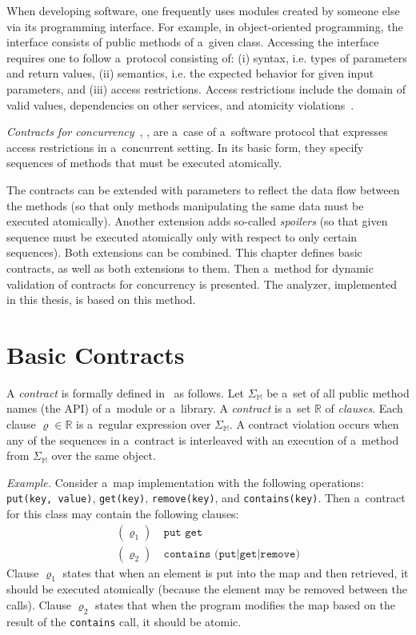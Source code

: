 When developing software, one frequently uses modules created by someone else
via its programming interface. For example, in object-oriented programming, the
interface consists of public methods of a~given class. Accessing the interface
requires one to follow a~protocol consisting of: (i) syntax, i.e. types of
parameters and return values, (ii) semantics, i.e. the expected behavior for
given input parameters, and (iii) access restrictions. Access restrictions
include the domain of valid values, dependencies on other services, and
atomicity violations~\cite{contracts}.

\emph{Contracts for concurrency}~\cite{FITPUB10817},
\cite{DBLP:journals/corr/SousaDFL15}, are a~case of a~software protocol that
expresses access restrictions in a~concurrent setting. In its basic form, they
specify sequences of methods that must be executed atomically.

\cite{highLevelDataRaces}

The contracts can
be extended with parameters to reflect the data flow between the methods (so
that only methods manipulating the same data must be executed atomically).
Another extension adds so-called \emph{spoilers} (so that given sequence must be
executed atomically only with respect to only certain sequences). Both
extensions can be combined. This chapter defines basic contracts, as well as
both extensions to them. Then a~method for dynamic validation of contracts for
concurrency is presented. The analyzer, implemented in this thesis, is based on
this method.

\section{Basic Contracts}
\label{basicContracts}

A \emph{contract} is formally defined in~\cite{FITPUB10817} as follows. Let
$\Sigma_\mathbb{M}$ be a~set of all public method names (the API) of a~module or
a~library. A \emph{contract} is a~set $\mathbb{R}$ of \emph{clauses}. Each
clause $\varrho \in \mathbb{R}$ is a~regular expression over
$\Sigma_\mathbb{M}$. A contract violation occurs when any of the sequences in
a~contract is interleaved with an execution of a~method from $\Sigma_\mathbb{M}$
over the same object.

\emph{Example.} Consider a~map implementation with the following operations:
\texttt{put(key, value)}, \texttt{get(key)}, \texttt{remove(key)}, and
\texttt{contains(key)}. Then a~contract for this class may contain the following
clauses:
\begin{align*}
    (\varrho_1) &\ \texttt{put get}\\
    (\varrho_2) &\ \texttt{contains (put|get|remove)}
\end{align*}
Clause $\varrho_1$ states that when an element is put into the map and then
retrieved, it should be executed atomically (because the element may be removed
between the calls). Clause $\varrho_2$ states that when the program modifies the
map based on the result of the \texttt{contains} call, it should be atomic.

